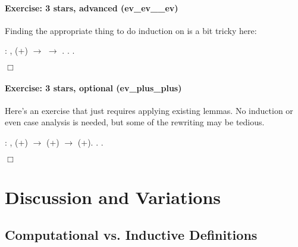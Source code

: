 \documentclass[12pt]{report}
\begin{document}
\paragraph{Exercise: 3 stars, advanced (ev\_ev\_\_ev)}

 Finding the appropriate thing to do induction on is a
    bit tricky here: \begin{coqdoccode}
\coqdocemptyline
\coqdocnoindent
{}  : \coqdockw{\ensuremath{\forall}}  ,\coqdoceol
\coqdocindent{1.00em}
 (+) \ensuremath{\rightarrow}   \ensuremath{\rightarrow}  .\coqdoceol
\coqdocnoindent
{}.\coqdoceol
 .\coqdoceol
\end{coqdoccode}
\ensuremath{\Box} 

\paragraph{Exercise: 3 stars, optional (ev\_plus\_plus)}

 Here's an exercise that just requires applying existing lemmas.  No
    induction or even case analysis is needed, but some of the rewriting
    may be tedious. \begin{coqdoccode}
\coqdocemptyline
\coqdocnoindent
{}  : \coqdockw{\ensuremath{\forall}}   ,\coqdoceol
\coqdocindent{1.00em}
 (+) \ensuremath{\rightarrow}  (+) \ensuremath{\rightarrow}  (+).\coqdoceol
\coqdocnoindent
{}.\coqdoceol
 .\coqdoceol
\end{coqdoccode}
\ensuremath{\Box} \begin{coqdoccode}
\coqdocemptyline
\end{coqdoccode}
\section{Discussion and Variations}

\subsection{Computational vs. Inductive Definitions}
\end{document}

